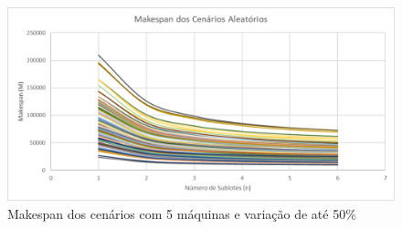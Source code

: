 \begin{figure}[!ht]
    \centering
    \includegraphics[width=12cm]{Resultados/Figuras/M05_50}
    \caption{Makespan dos cenários com 5 máquinas e variação de até 50\%}
    \label{fig:M05_50}
\end{figure}